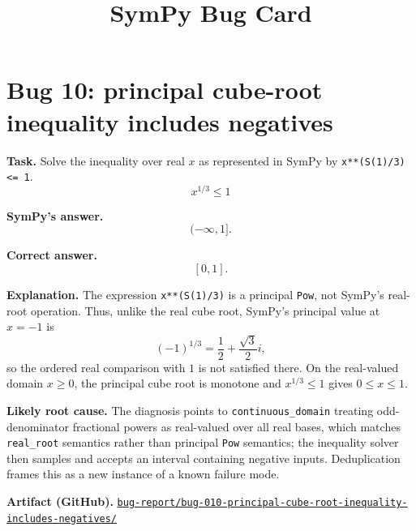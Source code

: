 \documentclass[11pt]{article}
\title{SymPy Bug Card}
\author{}
\date{}
\newcommand{\artifactrepo}{https://github.com/TODO-org/TODO-repo}
\newcommand{\bugbundle}[1]{\href{\artifactrepo/tree/main/bug-report/#1}{\nolinkurl{bug-report/#1/}}}
\begin{document}
\maketitle

\section*{Bug 10: principal cube-root inequality includes negatives}

\begin{counterexamplebox}
\textbf{Task.} Solve the inequality over real \(x\) as represented in SymPy by
\texttt{x**(S(1)/3) <= 1}.
\[
    x^{1/3} \leq 1
\]

\medskip
\textbf{SymPy's answer.}
\[
   (-\infty,1].
\]

\medskip
\textbf{Correct answer.}
\[
    [0,1].
\]

\medskip
\textbf{Explanation.} The expression \texttt{x**(S(1)/3)} is a principal
\texttt{Pow}, not SymPy's real-root operation. Thus, unlike the real cube root,
SymPy's principal value at \(x=-1\) is
\[
    (-1)^{1/3}=\frac{1}{2}+\frac{\sqrt{3}}{2}i,
\]
so the ordered real comparison with \(1\) is not satisfied there. On the
real-valued domain \(x\geq0\), the principal cube root is monotone and
\(x^{1/3}\leq1\) gives \(0\leq x\leq1\).

\medskip
\textbf{Likely root cause.} The diagnosis points to
\texttt{continuous\_domain} treating odd-denominator fractional powers as
real-valued over all real bases, which matches \texttt{real\_root} semantics
rather than principal \texttt{Pow} semantics; the inequality solver then samples
and accepts an interval containing negative inputs. Deduplication frames this
as a new instance of a known failure mode.

\medskip
\textbf{Artifact (GitHub).} \bugbundle{bug-010-principal-cube-root-inequality-includes-negatives}
\end{counterexamplebox}
\end{document}
